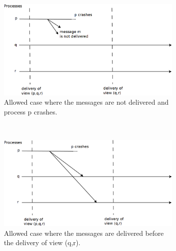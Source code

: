 \begin{figure}[h]
        \centering
        \begin{subfigure}[t]{0.4\textwidth}
                                        \centering
                                        \includegraphics[width=\textwidth]{img/systems-and-architectures/viewsynchronousgroupcommunication_a}
                                        \caption{Allowed case where the messages are not delivered and process p crashes.}
                                        \label{figure:viewsynchronousgroupcommunication:a}
        \end{subfigure}%
        ~
        \begin{subfigure}[t]{0.4\textwidth}
                                        \centering
                                        \includegraphics[width=\textwidth]{img/systems-and-architectures/viewsynchronousgroupcommunication_b}
                                        \caption{Allowed case where the messages are delivered before the delivery of view (q,r).}
                                        \label{figure:viewsynchronousgroupcommunication:b}
        \end{subfigure}
        ~
        \begin{subfigure}[t]{0.4\textwidth}

\end{subfigure}
\end{figure}
